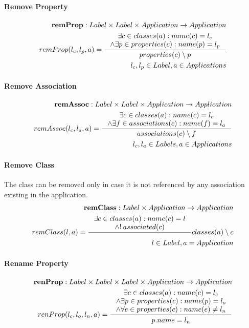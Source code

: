 \documentclass[11pt]{article}
\begin{document}
\paragraph{Remove Property}
\begin{align*}
 	\mathbf{remProp} : Label \times Label \times Application \rightarrow Application \\
 	remProp(l_c, l_p, a) = \inference{\exists c \in classes(a) : name(c) = l_c \\ \wedge \exists p \in properties(c) : name(p) = l_p
	}{properties(c) \setminus p }\\
	l_c, l_p \in Label, a \in Applications 
\end{align*}
\paragraph{Remove Association}
\begin{align*}
	\mathbf{remAssoc} : Label \times Label \times Application \rightarrow Application \\
	remAssoc(l_c, l_a, a) = \inference{\exists c \in classes(a) : name(c) = l_c \\ \wedge \exists f \in associations(c) : name(f) = l_a }{associations(c) \setminus f} \\
	l_c, l_a \in Labels, a \in Applications
\end{align*}
\paragraph{Remove Class} The class can be removed only in case it is not referenced by any association existing in the application.
\begin{align*}
	\mathbf{remClass} : Label \times Application \rightarrow Application \\
	remClass(l, a) = \inference{\exists c \in classes(a) : name(c) = l \\ \wedge !\: associated(c)
	} {classes(a) \setminus c }\\
	l \in Label, a = Application
\end{align*}
\paragraph{Rename Property}
\begin{align*}
	\mathbf{renProp} : Label \times Label \times Label \times Application \rightarrow Application \\
	renProp(l_c, l_o, l_n, a) = \inference{\exists c \in classes(a) : name(c) = l_c \\ \wedge \exists p \in properties(c) : name(p) = l_o \\ \wedge \forall e \in properties(c) : name(e) \neq l_n
	}{\begin{gathered}
		p.name = l_n 
	\end{gathered}}
\end{align*}
\end{document}
